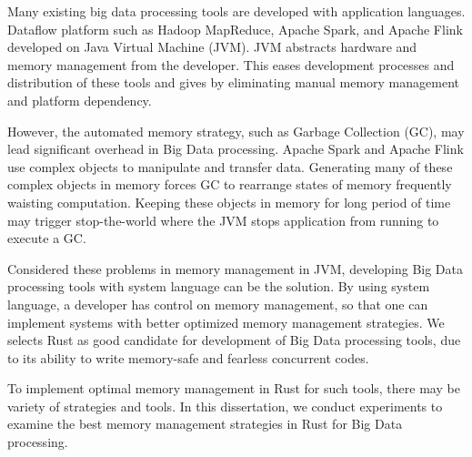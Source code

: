 
Many existing big data processing tools are developed with application languages. 
Dataflow platform such as Hadoop MapReduce,  Apache Spark, and Apache Flink 
developed on Java Virtual Machine (JVM). JVM abstracts hardware and memory management from the developer. 
This eases development processes and distribution of these tools and gives by eliminating manual memory management and 
platform dependency. 

However, the automated memory strategy, such as Garbage Collection (GC), may lead significant overhead in Big Data processing. 
Apache Spark and Apache Flink use complex objects to manipulate and transfer data. 
Generating many of these complex objects in memory forces GC to rearrange states of memory frequently waisting computation. 
Keeping these objects in memory for long period of time may trigger stop-the-world where the JVM stops application from running to
execute a GC. 

Considered these problems in memory management in JVM, developing Big Data processing tools with system language can be the solution.
By using system language, a developer has control on memory management, so that one can implement systems with better optimized memory management strategies.
We selects Rust as good candidate for development of Big Data processing tools, due to its ability to write memory-safe and fearless concurrent codes.

To implement optimal memory management in Rust for such tools, there may be variety of strategies and tools. 
In this dissertation, we conduct experiments to examine the best memory management strategies in Rust for Big Data processing. 






